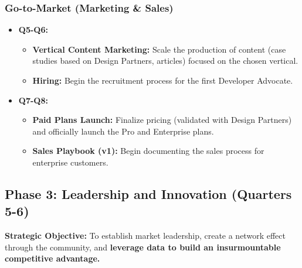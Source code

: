 \documentclass[11pt, a4paper, oneside]{article}
\begin{document}
\subsubsection{Go-to-Market (Marketing \& Sales)}
\begin{itemize}[leftmargin=*]
    \item \textbf{Q5-Q6:}
    \begin{itemize}
        \item \textbf{Vertical Content Marketing:} Scale the production of content (case studies based on Design Partners, articles) focused on the chosen vertical.
        \item \textbf{Hiring:} Begin the recruitment process for the first Developer Advocate.
    \end{itemize}
    \item \textbf{Q7-Q8:}
    \begin{itemize}
        \item \textbf{Paid Plans Launch:} Finalize pricing (validated with Design Partners) and officially launch the Pro and Enterprise plans.
        \item \textbf{Sales Playbook (v1):} Begin documenting the sales process for enterprise customers.
    \end{itemize}
\end{itemize}

\clearpage

\subsection{Phase 3: Leadership and Innovation (Quarters 5-6)}
\textbf{Strategic Objective:} To establish market leadership, create a network effect through the community, and \textbf{leverage data to build an insurmountable competitive advantage.}
\end{document}
